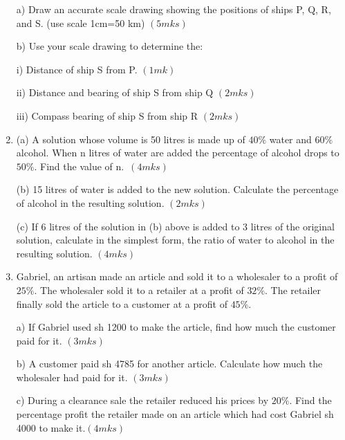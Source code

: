 \documentclass[
  a4paperpaper,
]{scrbook}
\begin{document}
\begin{tcolorbox}
\begin{enumerate}
  a) Draw an accurate scale drawing showing the positions of ships P, Q,
  R, and S. (use scale 1cm=50 km) \((5mks)\)

  b) Use your scale drawing to determine the:

  i) Distance of ship S from P. \((1mk)\)

  ii) Distance and bearing of ship S from ship Q \((2mks)\)

  iii) Compass bearing of ship S from ship R \((2mks)\)
\item
  (a) A solution whose volume is 50 litres is made up of \(40\%\) water
  and \(60\%\) alcohol. When n litres of water are added the percentage
  of alcohol drops to \(50\%\). Find the value of n.~\((4mks)\)

  (b) 15 litres of water is added to the new solution. Calculate the
  percentage of alcohol in the resulting solution. \((2mks)\)

  (c) If 6 litres of the solution in (b) above is added to 3 litres of
  the original solution, calculate in the simplest form, the ratio of
  water to alcohol in the resulting solution. \((4mks)\)
\item
  Gabriel, an artisan made an article and sold it to a wholesaler to a
  profit of \(25\%\). The wholesaler sold it to a retailer at a profit
  of \(32\%\). The retailer finally sold the article to a customer at a
  profit of \(45\%\).

  a) If Gabriel used sh 1200 to make the article, find how much the
  customer paid for it. \((3mks)\)

  b) A customer paid sh 4785 for another article. Calculate how much the
  wholesaler had paid for it. \((3mks)\)

  c) During a clearance sale the retailer reduced his prices by
  \(20\%\). Find the percentage profit the retailer made on an article
  which had cost Gabriel sh 4000 to make it.\((4mks)\)
\end{enumerate}

\end{tcolorbox}
\end{document}
